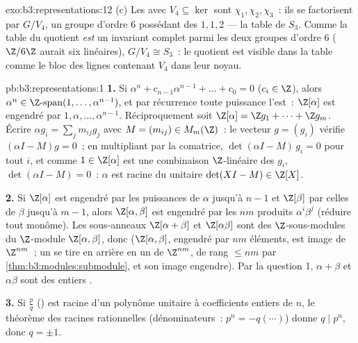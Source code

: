 \begin{solution}{exo:b3:representations:12}
(c) Les  avec $V_4 \subseteq \ker$ sont $\chi_1,
\chi_2, \chi_3$~: ils se factorisent par $G/V_4$, un groupe
d'ordre $6$ possédant des   $1, 1, 2$ ---
la table de $S_3$. Comme la table du quotient \emph{est} un
invariant complet parmi les deux groupes d'ordre $6$
($\Z/6\Z$ aurait six  linéaires), $G/V_4 \cong
S_3$~: le quotient est visible dans la table comme le bloc des
lignes contenant $V_4$ dans leur noyau.
\end{solution}

\begin{solution}{pb:b3:representations:1}
\textbf{1.} Si $\alpha^n + c_{n-1}\alpha^{n-1} + \dots + c_0 =
0$ ($c_i \in \Z$), alors $\alpha^n \in \Z\text{-span}(1, \dots,
\alpha^{n-1})$, et par récurrence toute puissance l'est~:
$\Z[\alpha]$ est engendré par $1, \alpha, \dots, \alpha^{n-1}$.
Réciproquement soit $\Z[\alpha] = \Z g_1 + \dots + \Z g_m$.
Écrire $\alpha g_i = \sum_j m_{ij}g_j$ avec $M = (m_{ij}) \in
M_m(\Z)$~: le vecteur $g = (g_i)$ vérifie $(\alpha I - M)g =
0$~; en multipliant par la comatrice, $\det(\alpha I -
M)\,g_i = 0$ pour tout $i$, et comme $1 \in \Z[\alpha]$ est une
combinaison $\Z$-linéaire des $g_i$, $\det(\alpha I - M) =
0$~: $\alpha$ est racine du unitaire $\det(XI - M) \in \Z[X]$.

\textbf{2.} Si $\Z[\alpha]$ est engendré par les puissances de
$\alpha$ jusqu'à $n-1$ et $\Z[\beta]$ par celles de $\beta$
jusqu'à $m - 1$, alors $\Z[\alpha,\beta]$ est engendré par les
$nm$ produits $\alpha^i\beta^j$ (réduire tout monôme). Les
sous-anneaux $\Z[\alpha + \beta]$ et $\Z[\alpha\beta]$ sont des
$\Z$-sous-modules du $\Z$-module 
$\Z[\alpha, \beta]$, donc  ($\Z[\alpha,\beta]$,
engendré par $nm$ éléments, est image de $\Z^{nm}$~; un
 se tire en arrière en un  de $\Z^{nm}$,
 de rang $\leq nm$ par
\cref{thm:b3:modules:submodule}, et son image engendre). Par
la question 1, $\alpha + \beta$ et $\alpha\beta$ sont des
entiers .

\textbf{3.} Si $\frac pq$ () est racine d'un
polynôme unitaire à coefficients entiers de  $n$, le
théorème des racines rationnelles (dénominateurs~: $p^n =
-q(\cdots)$) donne $q \mid p^n$, donc $q = \pm1$.


\end{solution}
